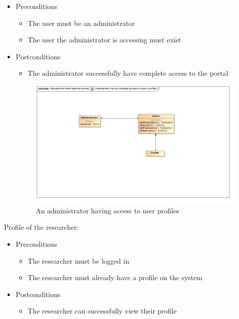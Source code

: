 \documentclass[a4paper,12pt]{article}
\begin{document}
\begin{itemize}
    \item Preconditions
    \begin{itemize}
        \item The user must be an administrator
        \item The user the administrator is accessing must exist
    \end{itemize}
    \item Postconditions
    \begin{itemize}
        \item The administrator successfully have complete access to the portal
    \end{itemize}
    
    \begin{figure}[H]
    \centering
    \caption{An administrator having access to user profiles}
    \includegraphics[width=1\textwidth]{use-case/administrator-access.png}
    \end{figure}
\end{itemize}
Profile of the researcher:
\begin{itemize}
    \item Preconditions
    \begin{itemize}
        \item The researcher must be logged in
        \item The researcher must already have a profile on the system
    \end{itemize}
    \item Postconditions
    \begin{itemize}
        \item The researcher can successfully view their profile
    \end{itemize}
\end{itemize}
\end{document}
